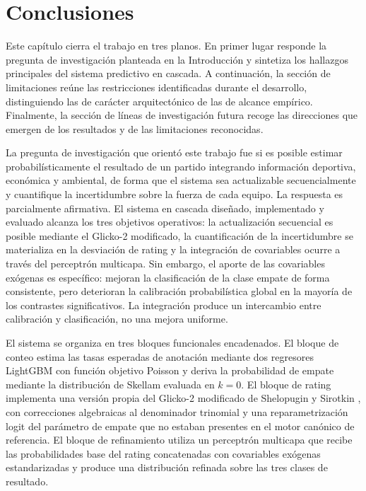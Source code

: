 \chapter{Conclusiones}
\label{ch:conclusiones}

Este cap\'itulo cierra el trabajo en tres planos. En primer lugar responde la pregunta de investigaci\'on planteada en la Introducci\'on y sintetiza los hallazgos principales del sistema predictivo en cascada. A continuaci\'on, la secci\'on de limitaciones re\'une las restricciones identificadas durante el desarrollo, distinguiendo las de car\'acter arquitect\'onico de las de alcance emp\'irico. Finalmente, la secci\'on de l\'ineas de investigaci\'on futura recoge las direcciones que emergen de los resultados y de las limitaciones reconocidas.

La pregunta de investigaci\'on que orient\'o este trabajo fue si es posible estimar probabil\'isticamente el resultado de un partido integrando informaci\'on deportiva, econ\'omica y ambiental, de forma que el sistema sea actualizable secuencialmente y cuantifique la incertidumbre sobre la fuerza de cada equipo. La respuesta es parcialmente afirmativa. El sistema en cascada dise\~nado, implementado y evaluado alcanza los tres objetivos operativos: la actualizaci\'on secuencial es posible mediante el Glicko-2 modificado, la cuantificaci\'on de la incertidumbre se materializa en la desviaci\'on de rating y la integraci\'on de covariables ocurre a trav\'es del perceptr\'on multicapa. Sin embargo, el aporte de las covariables ex\'ogenas es espec\'ifico: mejoran la clasificaci\'on de la clase empate de forma consistente, pero deterioran la calibraci\'on probabil\'istica global en la mayor\'ia de los contrastes significativos. La integraci\'on produce un intercambio entre calibraci\'on y clasificaci\'on, no una mejora uniforme.

El sistema se organiza en tres bloques funcionales encadenados. El bloque de conteo estima las tasas esperadas de anotaci\'on mediante dos regresores LightGBM con funci\'on objetivo Poisson y deriva la probabilidad de empate mediante la distribuci\'on de Skellam evaluada en $k=0$. El bloque de rating implementa una versi\'on propia del Glicko-2 modificado de Shelopugin y Sirotkin \cite{Glicko2Mod}, con correcciones algebraicas al denominador trinomial y una reparametrizaci\'on logit del par\'ametro de empate que no estaban presentes en el motor can\'onico de referencia. El bloque de refinamiento utiliza un perceptr\'on multicapa que recibe las probabilidades base del rating concatenadas con covariables ex\'ogenas estandarizadas y produce una distribuci\'on refinada sobre las tres clases de resultado.

